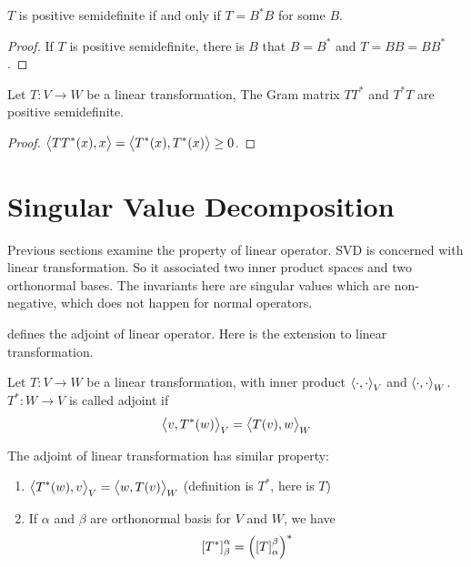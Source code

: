 \begin{theorem}
    $T$ is positive semidefinite if and only if $T = B^*B$ for some $B$.    
\end{theorem}
\begin{proof}
    If $T$ is positive semidefinite, there is $B$ that $B = B^*$ and $T = BB = BB^*$.
\end{proof}


\begin{theorem}\label{tt_positive_semidefinite}
    Let $T:V \rightarrow W$ be a linear transformation, The Gram matrix $TT^*$ and $T^*T$ are positive semidefinite.
\end{theorem}
\begin{proof}
    $\innerproduct{TT^*(x)}{x} = \innerproduct{T^*(x)}{T^*(x)} \geq 0$.
\end{proof}



\section{Singular Value Decomposition}

Previous sections examine the property of linear operator. SVD is concerned with linear transformation. So it associated two inner product spaces and two orthonormal bases. The invariants here are singular values which are non-negative, which does not happen for normal operators.

\begin{definition}
     defines the adjoint of linear operator. Here is the extension to linear transformation.
    
    Let $T:V \rightarrow W$ be a linear transformation, with inner product $\innerproduct{\cdot}{\cdot}_V$ and $\innerproduct{\cdot}{\cdot}_W$. $T^*: W \rightarrow V$ is called adjoint if 
    \begin{equation}
        \innerproduct{v}{T^*(w)}_V = \innerproduct{T(v)}{w}_W
    \end{equation}
\end{definition}

\begin{theorem}
    The adjoint of linear transformation has similar property:
\begin{enumerate}
    \item $\innerproduct{T^*(w)}{v}_V = \innerproduct{w}{T(v)}_W$ (definition is $T^*$, here is $T$)
    \item If $\alpha$ and $\beta$ are orthonormal basis for $V$ and $W$, we have \begin{equation}
        \coordinate{T^*}_\beta^\alpha = \mleft(\coordinate{T}_\alpha^\beta\mright)^*
    \end{equation}
\end{enumerate}
\end{theorem}



